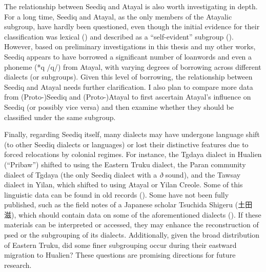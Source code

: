 The relationship between Seediq and Atayal is also worth investigating in depth. For a long time, Seediq and Atayal, as the only members of the Atayalic subgroup, have hardly been questioned, even though the initial evidence for their classification was lexical (\cite{ferrell1969}) and described as a ``self-evident'' subgroup (\cite{blust1999subgrouping}). However, based on preliminary investigations in this thesis and my other works, Seediq appears to have borrowed a significant number of loanwords and even a phoneme (*q /q/) from Atayal, with varying degrees of borrowing across different dialects (or subgroups). Given this level of borrowing, the relationship between Seediq and Atayal needs further clarification. I also plan to compare more data from (Proto-)Seediq and (Proto-)Atayal to first ascertain Atayal's influence on Seediq (or possibly vice versa) and then examine whether they should be classified under the same subgroup.

Finally, regarding Seediq itself, many dialects may have undergone language shift (to other Seediq dialects or languages) or lost their distinctive features due to forced relocations by colonial regimes. For instance, the Tgdaya dialect in Hualien (``Pribaw'') shifted to using the Eastern Truku dialect, the Paran community dialect of Tgdaya (the only Seediq dialect with a \textit{ð} sound), and the Tawsay dialect in Yilan, which shifted to using Atayal or Yilan Creole. Some of this linguistic data can be found in old records (\cite{tashiro1900easterntw, bullock1874formosan}). Some have not been fully published, such as the field notes of a Japanese scholar Tsuchida Shigeru (土田滋), which should contain data on some of the aforementioned dialects (\cite{li2022tsuchida}). If these materials can be interpreted or accessed, they may enhance the reconstruction of \acl{psed} or the subgrouping of its dialects. Additionally, given the broad distribution of Eastern Truku, did some finer subgrouping occur during their eastward migration to Hualien? These questions are promising directions for future research.